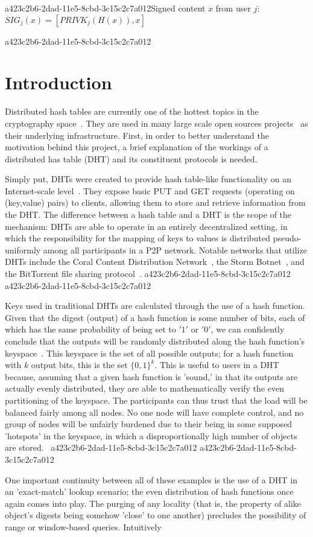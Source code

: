 \documentclass[12pt]{article}
\begin{document}
a423c2b6-2dad-11e5-8cbd-3c15c2c7a012Signed content $x$ from user $j$: $SIG_j(x) = \left[ PRIVK_j( H(x) ), x \right]$

a423c2b6-2dad-11e5-8cbd-3c15c2c7a012\section{Introduction}
\par Distributed hash tables are currently one of the hottest topics in the cryptography space~\cite{Stoica:2001dj,Rowstron:2001ea,Ratnasamy:2001wn}. They are used in many large scale open sources projects~\cite{Freitas:2013tb,Xu:2010vs,Perfitt:2010fh} as their underlying infrastructure. First, in order to better understand the motivation behind this project, a brief explanation of the workings of a distributed has table (DHT) and its constituent protocols is needed.

\par Simply put, DHTs were created to provide hash table-like functionality on an Internet-scale level~\cite{Ratnasamy:2001wn}. They expose basic PUT and GET requests (operating on (key,value) pairs) to clients, allowing them to store and retrieve information from the DHT. The difference between a hash table and a DHT is the scope of the mechanism: DHTs are able to operate in an entirely decentralized setting, in which the responsibility for the mapping of keys to values is distributed pseudo-uniformly among all participants in a P2P network. Notable networks that utilize DHTs include the Coral Content Distribution Network~\cite{Freedman:2004vb}, the Storm Botnet~\cite{Holz:2008uk}, and the BitTorrent file sharing protocol~\cite{Cohen:y1_8mBnw}.
a423c2b6-2dad-11e5-8cbd-3c15c2c7a012
a423c2b6-2dad-11e5-8cbd-3c15c2c7a012\par Keys used in traditional DHTs are calculated through the use of a hash function. Given that the digest (output) of a hash function is some number of bits, each of which has the same probability of being set to $'1'$ or $'0'$, we can confidently conclude that the outputs will be randomly distributed along the hash function's keyspace~. This keyspace is the set of all possible outputs; for a hash function with $k$ output bits, this is the set $\{0,1\}^k$. This is useful to users in a DHT because, assuming that a given hash function is 'sound,' in that its outputs are actually evenly distributed, they are able to mathematically verify the even partitioning of the keyspace. The participants can thus trust that the load will be balanced fairly among all nodes. No one node will have complete control, and no group of nodes will be unfairly burdened due to their being in some supposed 'hotspots' in the keyspace, in which a disproportionally high number of objects are stored.~
a423c2b6-2dad-11e5-8cbd-3c15c2c7a012
a423c2b6-2dad-11e5-8cbd-3c15c2c7a012\par One important continuity between all of these examples is the use of a DHT in an 'exact-match' lookup scenario; the even distribution of hash functions once again comes into play. The purging of any locality (that is, the property of alike object's digests being somehow 'close' to one another) precludes the possibility of range or window-based queries. Intuitively
\end{document}
